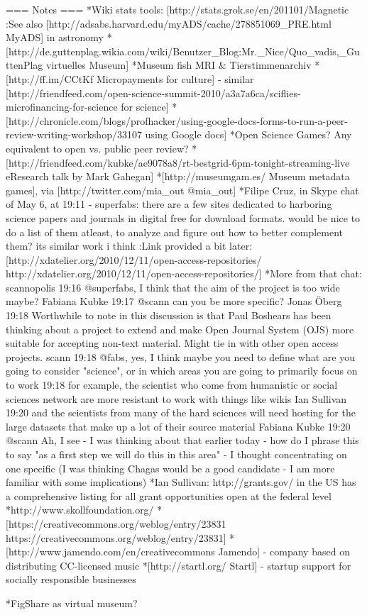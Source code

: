 === Notes ===
*Wiki stats tools: [http://stats.grok.se/en/201101/Magnetic%
:See also [http://adsabs.harvard.edu/myADS/cache/278851069_PRE.html MyADS] in astronomy
*[http://de.guttenplag.wikia.com/wiki/Benutzer_Blog:Mr._Nice/Quo_vadis,_GuttenPlag virtuelles Museum]
*Museum fish MRI & Tierstimmenarchiv
*[http://ff.im/CCtKf Micropayments for culture]  - similar [http://friendfeed.com/open-science-summit-2010/a3a7a6ca/sciflies-microfinancing-for-science for science]
*[http://chronicle.com/blogs/profhacker/using-google-docs-forms-to-run-a-peer-review-writing-workshop/33107 using Google docs]
*Open Science Games? Any equivalent to open vs. public peer review?
*[http://friendfeed.com/kubke/ae9078a8/rt-bestgrid-6pm-tonight-streaming-live eResearch talk by Mark Gahegan]
*[http://museumgam.es/ Museum metadata games], via [http://twitter.com/mia_out @mia_out]
*Filipe Cruz, in Skype chat of May 6, at 19:11 - superfabs: there are a few sites dedicated to harboring science papers and journals in digital free for download formats. would be nice to do a list of them atleast, to analyze and figure out how to better complement them? its similar work i think
:Link provided a bit later: [http://xdatelier.org/2010/12/11/open-access-repositories/ http://xdatelier.org/2010/12/11/open-access-repositories/]
*More from that chat: 
scannopolis 19:16 
@superfabs, I think that the aim of the project is too wide maybe?
Fabiana Kubke 19:17 
@scann can you be more specific?
Jonas Öberg 19:18 
Worthwhile to note in this discussion is that Paul Boshears has been thinking about a project to extend and make Open Journal System (OJS) more suitable for accepting non-text material. Might tie in with other open access projects.
scann 19:18 
@fabs, yes, I think maybe you need to define what are you going to consider "science", or in which areas you are going to primarily focus on to work
19:18
for example, the scientist who come from humanistic or social sciences network are more resistant to work with things like wikis
Ian Sullivan 19:20 
and the scientists from many of the hard sciences will need hosting for the large datasets that make up a lot of their source material
Fabiana Kubke 19:20 
@scann Ah, I see - I was thinking about that earlier today - how do I phrase this to say "as a first step we will do this in this area" - I thought concentrating on one specific (I was thinking Chagas would be a good candidate - I am more familiar with some implications)
*Ian Sullivan: http://grants.gov/  in the US has a comprehensive listing for all grant opportunities open at the federal level
*http://www.skollfoundation.org/
*[https://creativecommons.org/weblog/entry/23831 https://creativecommons.org/weblog/entry/23831]
*[http://www.jamendo.com/en/creativecommons Jamendo] - company based on distributing CC-licensed music
*[http://startl.org/ Startl] - startup support for socially responsible businesses

*FigShare as virtual museum?

